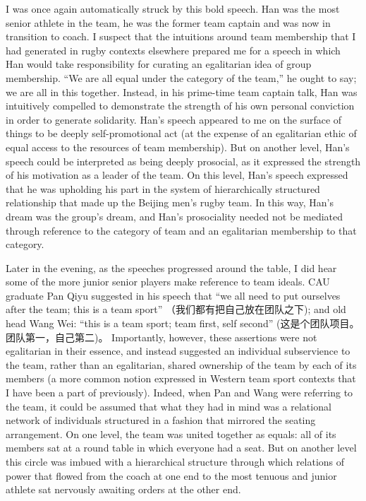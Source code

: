 \begin{CJK}{UTF8}{gbsn}
I was once again automatically struck by this bold speech.  Han was the most senior athlete in the team, he was the former team captain and was now in transition to coach.  I suspect that the intuitions around team membership that I had generated in rugby contexts elsewhere prepared me for a speech in which Han would take responsibility for curating an egalitarian idea of group membership.  ``We are all equal under the category of the team,'' he ought to say; we are all in this together.   Instead, in his prime-time team captain talk, Han was intuitively compelled to demonstrate the strength of his own personal conviction in order to generate solidarity. Han's speech appeared to me on the surface of things to be deeply self-promotional act (at the expense of an egalitarian ethic of equal access to the resources of team membership). But on another level, Han's speech could be interpreted as being deeply prosocial, as it expressed the strength of his motivation as a leader of the team. On this level, Han's speech expressed that he was upholding his part in the system of hierarchically structured relationship that made up the Beijing men's rugby team.  In this way, Han's dream was the group's dream, and Han's prosociality needed not be mediated through reference to the category of team and an egalitarian membership to that category.

Later in the evening, as the speeches progressed around the table, I did hear some of the more junior senior players make reference to team ideals.   CAU graduate Pan Qiyu suggested in his speech that ``we all need to put ourselves after the team; this is a team sport'' （我们都有把自己放在团队之下); and old head Wang Wei: ``this is a team sport; team first, self second'' (这是个团队项目。团队第一，自己第二)。 Importantly, however, these assertions were not egalitarian in their essence, and instead suggested an individual subservience to the team, rather than an egalitarian, shared ownership of the team by each of its members (a more common notion expressed in Western team sport contexts that I have been a part of previously).  Indeed, when Pan and Wang were referring to the team, it could be assumed that what they had in mind was a relational network of individuals structured in a fashion that mirrored the seating arrangement. On one level, the team was united together as equals: all of its members sat at a round table in which everyone had a seat. But on another level this circle was imbued with a hierarchical structure through which relations of power that flowed from the coach at one end to the most tenuous and junior athlete sat nervously awaiting orders at the other end.


\end{CJK}
